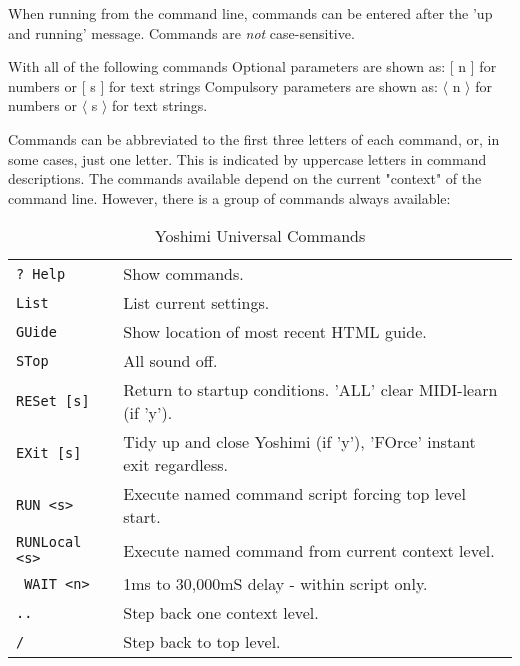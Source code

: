    When running from the command line, commands can be entered after the
   'up and running' message. Commands are \textsl{not} case-sensitive.

   \noindent With all of the following commands \newline
   Optional parameters are shown as: [ n ] for numbers or [ s ] for text strings \newline
   Compulsory parameters are shown as: \begin{math} \langle \end{math} n \begin{math} \rangle \end{math} for numbers or \begin{math} \langle \end{math} s \begin{math} \rangle \end{math} for text
   strings.

   \noindent Commands can be abbreviated to the first three letters of each command,
   or, in some cases, just one letter.  This is indicated by uppercase
   letters in command descriptions. The commands available depend on the
   current "context" of the command line. However, there is a group of
   commands always available:

\begin{center}
\begin{longtable}{p{3cm} p{12cm}}
\caption[Yoshimi Universial Commands]{Yoshimi Universal Commands} \\
\texttt{? Help} &
   Show commands. \\
\texttt{List} &
   List current settings. \\
\texttt{GUide} &
   Show location of most recent HTML guide. \\
\texttt{STop} &
   All sound off. \\
\texttt{RESet [s]} &
   Return to startup conditions. 'ALL' clear MIDI-learn (if 'y'). \\
\texttt{EXit [s]} &
   Tidy up and close Yoshimi (if 'y'), 'FOrce' instant exit regardless. \\
\texttt{RUN <s>} &
   Execute named command script forcing top level start.\\
\texttt{RUNLocal <s>} &
   Execute named command from current context level.\\
\texttt{  WAIT <n>} &
   1ms to 30,000mS delay - within script only.\\
\texttt{..} &
   Step back one context level.\\
\texttt{/} &
   Step back to top level.\\
\end{longtable}
\end{center}

